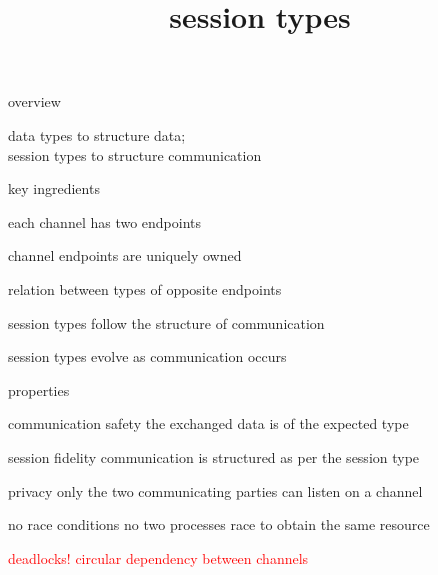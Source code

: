 \documentclass[dvipsnames]{beamer}
\date{}
\title{session types}
\begin{document}
  \maketitle

  \begin{frame}{overview}
    \begin{center}
      data types to structure data;\\
      session types to structure communication
    \end{center}
  \end{frame}

  \begin{frame}{key ingredients}
    \begin{description}
      \setlength\itemsep{1em}
    \item[endpoints] each channel has two endpoints
    \item[linearity] channel endpoints are uniquely owned
    \item[duality] relation between types of opposite endpoints
    \item[structure] session types follow the structure of communication
    \item[change] session types evolve as communication occurs
    \end{description}
  \end{frame}

  \begin{frame}{properties}
    \begin{block}{communication safety}
      the exchanged data is of the expected type
    \end{block}
    \begin{block}{session fidelity}
      communication is structured as per the session type
    \end{block}
    \begin{block}{privacy}
      only the two communicating parties can listen on a channel
    \end{block}
    \begin{block}{no race conditions}
      no two processes race to obtain the same resource
    \end{block}
    \begin{block}{\textcolor{red}{deadlocks!}}
      \textcolor{red}{circular dependency between channels}
    \end{block}
  \end{frame}
\end{document}
